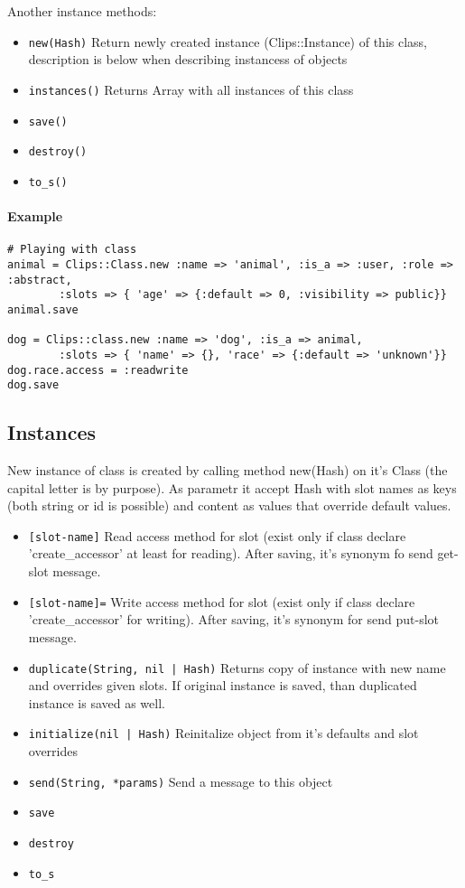 \documentclass[a4paper,10pt]{article}
\begin{document}
Another instance methods:
\begin{itemize}
 \item \texttt{new(Hash)} Return newly created instance (Clips::Instance) of this class, description is below when describing instancess of objects
 \item \texttt{instances()} Returns Array with all instances of this class
 \item \texttt{save()}
 \item \texttt{destroy()}
 \item \texttt{to\_s()}
\end{itemize}

\paragraph{Example}
\begin{verbatim}
# Playing with class
animal = Clips::Class.new :name => 'animal', :is_a => :user, :role => :abstract, 
		:slots => { 'age' => {:default => 0, :visibility => public}}
animal.save

dog = Clips::class.new :name => 'dog', :is_a => animal,
		:slots => { 'name' => {}, 'race' => {:default => 'unknown'}}
dog.race.access = :readwrite
dog.save
\end{verbatim}

\subsection{Instances}
New instance of class is created by calling method new(Hash) on it's Class (the capital letter is by purpose). As parametr it accept Hash with slot names as keys (both string or id is possible) and content as values that override default values.

\begin{itemize}
 \item \texttt{[slot-name]} Read access method for slot (exist only if class declare 'create\_accessor' at least for reading). After saving, it's synonym fo send get-slot message.
 \item \texttt{[slot-name]=} Write access method for slot (exist only if class declare 'create\_accessor' for writing). After saving, it's synonym for send put-slot message.
 \item \texttt{duplicate(String, nil | Hash)} Returns copy of  instance with new name and overrides given slots. If original instance is saved, than duplicated instance is saved as well.
 \item \texttt{initialize(nil | Hash)} Reinitalize object from it's defaults and slot overrides
 \item \texttt{send(String, *params)} Send a message to this object
 \item \texttt{save}
 \item \texttt{destroy}
 \item \texttt{to\_s}
\end{itemize}
\end{document}
